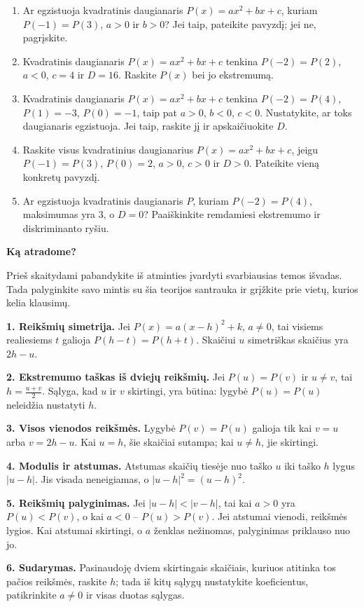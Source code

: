 \documentclass[12pt,a4paper]{article}
\newcommand{\svarbu}{\tikz[baseline=(zenklas.base)]\node[circle,draw=blue!50!black,line width=0.6pt,minimum size=4.5mm,inner sep=0pt,font=\sffamily\bfseries\small,text=blue!50!black] (zenklas) {!};}
\begin{document}
\begin{enumerate}
\item Ar egzistuoja kvadratinis daugianaris $P(x)=ax^2+bx+c$, kuriam $P(-1)=P(3)$, $a>0$ ir $b>0$? Jei taip, pateikite pavyzdį; jei ne, pagrįskite.
\item Kvadratinis daugianaris $P(x)=ax^2+bx+c$ tenkina $P(-2)=P(2)$, $a<0$, $c=4$ ir $D=16$. Raskite $P(x)$ bei jo ekstremumą.
\item Kvadratinis daugianaris $P(x)=ax^2+bx+c$ tenkina $P(-2)=P(4)$, $P(1)=-3$, $P(0)=-1$, taip pat $a>0$, $b<0$, $c<0$. Nustatykite, ar toks daugianaris egzistuoja. Jei taip, raskite jį ir apskaičiuokite $D$.
\item Raskite visus kvadratinius daugianarius $P(x)=ax^2+bx+c$, jeigu $P(-1)=P(3)$, $P(0)=2$, $a>0$, $c>0$ ir $D>0$. Pateikite vieną konkretų pavyzdį.
\item Ar egzistuoja kvadratinis daugianaris $P$, kuriam $P(-2)=P(4)$, maksimumas yra $3$, o $D=0$? Paaiškinkite remdamiesi ekstremumo ir diskriminanto ryšiu.
\end{enumerate}
\newpage
\begin{center}{\Large\bfseries Ką atradome?}\end{center}
Prieš skaitydami pabandykite iš atminties įvardyti svarbiausias temos išvadas. Tada palyginkite savo mintis su šia teorijos santrauka ir grįžkite prie vietų, kurios kelia klausimų.
\begin{tcolorbox}[colback=blue!3,colframe=blue!40!black,boxrule=0.5pt,arc=1mm,colbacktitle=blue!8,coltitle=black,title={\svarbu\quad\bfseries Svarbiausios temos išvados}]
\textbf{1. Reikšmių simetrija.} Jei $P(x)=a(x-h)^2+k$, $a\ne0$, tai visiems realiesiems $t$ galioja $P(h-t)=P(h+t)$. Skaičiui $u$ simetriškas skaičius yra $2h-u$.

\textbf{2. Ekstremumo taškas iš dviejų reikšmių.} Jei $P(u)=P(v)$ ir $u\ne v$, tai $h=\frac{u+v}{2}$. Sąlyga, kad $u$ ir $v$ skirtingi, yra būtina: lygybė $P(u)=P(u)$ neleidžia nustatyti $h$.

\textbf{3. Visos vienodos reikšmės.} Lygybė $P(v)=P(u)$ galioja tik kai $v=u$ arba $v=2h-u$. Kai $u=h$, šie skaičiai sutampa; kai $u\ne h$, jie skirtingi.

\textbf{4. Modulis ir atstumas.} Atstumas skaičių tiesėje nuo taško $u$ iki taško $h$ lygus $|u-h|$. Jis visada neneigiamas, o $|u-h|^2=(u-h)^2$.

\textbf{5. Reikšmių palyginimas.} Jei $|u-h|<|v-h|$, tai kai $a>0$ yra $P(u)<P(v)$, o kai $a<0$ – $P(u)>P(v)$. Jei atstumai vienodi, reikšmės lygios. Kai atstumai skirtingi, o $a$ ženklas nežinomas, palyginimas priklauso nuo jo.

\textbf{6. Sudarymas.} Pasinaudoję dviem skirtingais skaičiais, kuriuos atitinka tos pačios reikšmės, raskite $h$; tada iš kitų sąlygų nustatykite koeficientus, patikrinkite $a\ne0$ ir visas duotas sąlygas.
\end{tcolorbox}
\end{document}
